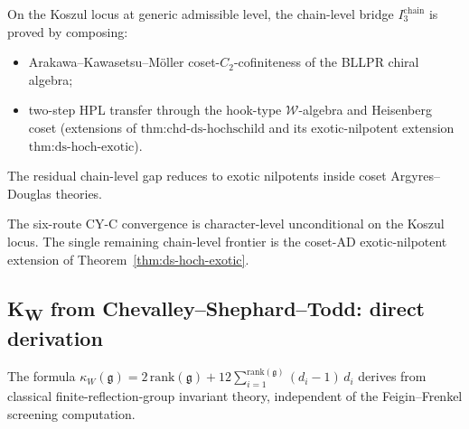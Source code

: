 \documentclass[11pt]{article}
\begin{document}
\begin{theorem}
\label{thm:cy-c-chain-level-koszul}
On the Koszul locus at generic admissible level, the chain-level
bridge $I_3^{\mathrm{chain}}$ is proved by composing:
\begin{itemize}
\item Arakawa--Kawasetsu--M\"oller coset-$C_2$-cofiniteness of the
BLLPR chiral algebra;
\item two-step HPL transfer through the hook-type $\mathcal{W}$-algebra
and Heisenberg coset (extensions of
$\mathrm{thm\text{:}chd\text{-}ds\text{-}hochschild}$ and its
exotic-nilpotent extension
$\mathrm{thm\text{:}ds\text{-}hoch\text{-}exotic}$).
\end{itemize}
The residual chain-level gap reduces to exotic nilpotents inside
coset Argyres--Douglas theories.
\end{theorem}

\begin{corollary}
The six-route CY-C convergence is character-level unconditional on
the Koszul locus. The single remaining chain-level frontier is the
coset-AD exotic-nilpotent extension of
Theorem~\ref{thm:ds-hoch-exotic}.
\end{corollary}

\subsection{K\textsubscript{W} from Chevalley--Shephard--Todd: direct derivation}
\label{subsec:kw-cst-direct}

\begin{theorem}
\label{thm:kw-cst-direct}
The formula $\kappa_W(\mathfrak{g}) = 2\,\mathrm{rank}(\mathfrak{g}) +
12 \sum_{i=1}^{\mathrm{rank}(\mathfrak{g})} (d_i - 1)\,d_i$
derives from classical finite-reflection-group invariant theory,
independent of the Feigin--Frenkel screening computation.
\end{theorem}
\end{document}

